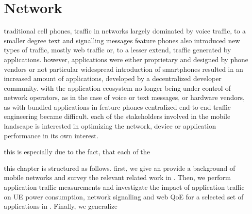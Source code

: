 \chapter{Network}\label{chap:network}


traditional cell phones, traffic in networks largely dominated by voice traffic, to a smaller degree text and signalling messages
feature phones also introduced new types of traffic, mostly web traffic or, to a lesser extend, traffic generated by applications.
however, applications were either proprietary and designed by phone vendors or not particular widespread
introduction of smartphones resulted in an increased amount of applications, developed by a decentralized developer community.
with the application ecosystem no longer being under control of network operators, as in the case of voice or text messages, or hardware vendors, as with bundled applications in feature phones centralized end-to-end traffic engineering became difficult.
each of the stakeholders involved in the mobile landscape is interested in optimizing the network, device or application performance in its own interest.

this is especially due to the fact, that each of the 

this chapter is structured as follows.
first, we give an provide a background of mobile networks and survey the relevant related work in .
Then, we perform application traffic measurements and investigate the impact of application traffic on \gls{UE} power consumption, network signalling and web \gls{QoE} for a selected set of applications in .
Finally, we generalize






